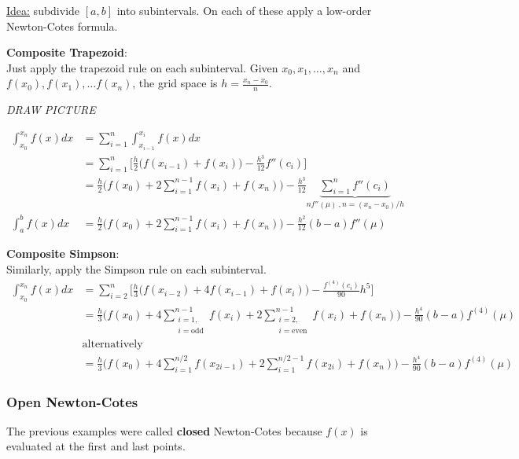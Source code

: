 \documentclass[12pt]{article}
\begin{document}
\underline{Idea:} subdivide $[a,b]$ into subintervals. On each of these apply a low-order Newton-Cotes formula.

\textbf{Composite Trapezoid}:\\
Just apply the trapezoid rule on each subinterval. Given $x_0, x_1, \dots, x_n$ and $f(x_0), f(x_1), \dots f(x_n)$, the grid space is $h = \frac{x_n-x_0}{n}$.

\textit{DRAW PICTURE}

\begin{align*}
\int_{x_0}^{x_n} f(x)dx &= \sum_{i=1}^n \int_{x_{i-1}}^{x_i} f(x)dx\\
&= \sum_{i=1}^n \bigl[ \frac{h}{2}\bigl(f(x_{i-1}) + f(x_i)\bigr) - \frac{h^3}{12}f''(c_i) \bigr] \\
&= \frac{h}{2}\bigl(f(x_0) + 2\sum_{i=1}^{n-1}f(x_i) + f(x_n)\bigr) - \frac{h^3}{12} \underbrace{\sum_{i=1}^n f''(c_i)}_{n f''(\mu)\:, n = (x_n-x_0)/h}\\
%
\int_{a}^{b} f(x)dx &= \boxed{\frac{h}{2}\bigl(f(x_0) + 2\sum_{i=1}^{n-1}f(x_i) + f(x_n)\bigr) - \frac{h^2}{12}(b-a)f''(\mu) }
\end{align*}
 
\textbf{Composite Simpson}:\\
Similarly, apply the Simpson rule on each subinterval. %
%
\begin{align*}
\int_{x_0}^{x_n} f(x)dx &= \sum_{i=2}^n \bigl[ \frac{h}{3}\bigl(f(x_{i-2}) + 4f(x_{i-1}) + f(x_i)\bigr) - \frac{f^{(4)}(c_i)}{90}h^5 \bigr]\\
&= \frac{h}{3}\bigl(f(x_0) + 4\sum_{\substack{i=1,\\i=\text{odd}}}^{n-1} f(x_i) + 2\sum_{\substack{i=2,\\i=\text{even}}}^{n-1} f(x_i) + f(x_n)\bigr) - \frac{h^4}{90}(b-a)f^{(4)}(\mu)\\
&\text{alternatively}\\
&= \frac{h}{3}\bigl(f(x_0) + 4\sum_{i=1}^{n/2} f(x_{2i-1}) + 2\sum_{i=1}^{n/2-1} f(x_{2i}) + f(x_n)\bigr) - \frac{h^4}{90}(b-a)f^{(4)}(\mu)
\end{align*}


\subsubsection*{Open Newton-Cotes}
The previous examples were called \textbf{closed} Newton-Cotes because $f(x)$ is evaluated at the first and last points.
\end{document}

